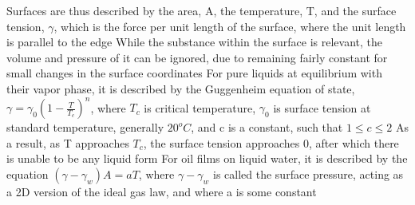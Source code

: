 \documentclass[11 pt, twoside]{article}
\newenvironment{outline*}
{
	\begin{outline}[enumerate]
	}
	{\end{outline}
}
\begin{document}
\begin{outline*}
\2 Surfaces are thus described by the area, A, the temperature, T, and the surface tension, $\gamma$, which is the force per unit length of the surface, where the unit length is parallel to the edge
\2 While the substance within the surface is relevant, the volume and pressure of it can be ignored, due to remaining fairly constant for small changes in the surface coordinates
\2 For pure liquids at equilibrium with their vapor phase, it is described by the Guggenheim equation of state, $\gamma = \gamma_0(1 - \frac{T}{T_c})^n$, where $T_c$ is critical temperature, $\gamma_0$ is surface tension at standard temperature, generally $20^o C$, and c is a constant, such that $1 \leq c \leq 2$
\3 As a result, as T approaches $T_c$, the surface tension approaches 0, after which there is unable to be any liquid form
\2 For oil films on liquid water, it is described by the equation $(\gamma - \gamma_w)A = aT$, where $\gamma - \gamma_w$ is called the surface pressure, acting as a 2D version of the ideal gas law, and where a is some constant
\end{outline*}
\end{document}

